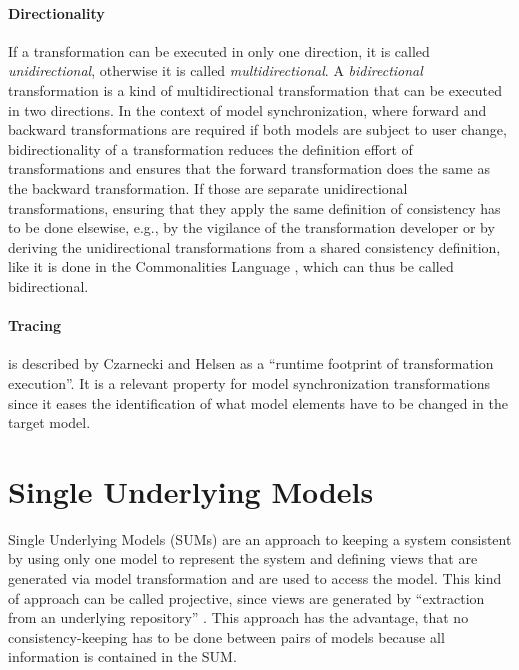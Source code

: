 \paragraph{Directionality}
If a transformation can be executed in only one direction, it is called \emph{unidirectional}, otherwise it is called \emph{multidirectional}.
A \emph{bidirectional} transformation is a kind of multidirectional transformation that can be executed in two directions.
In the context of model synchronization, where forward and backward transformations are required if both models are subject to user change, bidirectionality of a transformation reduces the definition effort of transformations and ensures that the forward transformation does the same as the backward transformation. If those are separate unidirectional transformations, 
ensuring that they apply the same definition of consistency has to be done elsewise, e.g., by the vigilance of the transformation developer or by deriving the unidirectional transformations from a shared consistency definition, like it is done in the Commonalities Language \cite{klare_commonalities_2019}, which can thus be called bidirectional.

\paragraph{Tracing} is described by Czarnecki and Helsen as a \enquote{runtime footprint of transformation execution}. It is a relevant property for model synchronization transformations since it eases the identification of what model elements have to be changed in the target model.



\section{Single Underlying Models}
Single Underlying Models (SUMs) \cite{atkinson_orthographic_2010_SUM_paper} are an approach to keeping a system consistent by using only one model to represent the system and defining views that are generated via model transformation and are used to access the model.
This kind of approach can be called projective, since views are generated by \enquote{extraction from an underlying repository} \cite{iso_42010}.
This approach has the advantage, that no consistency-keeping has to be done between pairs of models because all information is contained in the SUM.

